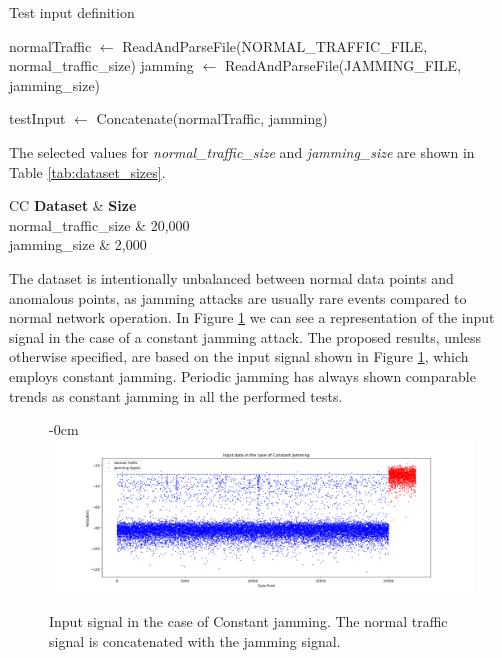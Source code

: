 \documentclass[futureinternet,article,submit,pdftex,moreauthors]{Definitions/mdpi}
\begin{document}
\begin{algorithm}
	\caption{Test input definition}\label{alg:dataset_concatenation}
	\begin{algorithmic}[1]
	\State normalTraffic $\gets$ ReadAndParseFile(NORMAL\_TRAFFIC\_FILE, normal\_traffic\_size)
	\State jamming $\gets$ ReadAndParseFile(JAMMING\_FILE, jamming\_size)

	\State testInput $\gets$ Concatenate(normalTraffic, jamming)
	\end{algorithmic}
\end{algorithm}

The selected values for \textit{normal\_traffic\_size} and \textit{jamming\_size} are shown in Table \ref{tab:dataset_sizes}. 

\begin{table}[H]
	\caption{Dataset sizes used for the tuning and testing phases.}\label{tab:dataset_sizes}
	\begin{tabularx}{\textwidth}{CC}
	\toprule
	\textbf{Dataset} & \textbf{Size} \\
	\midrule
	normal\_traffic\_size & 20,000 \\
	jamming\_size & 2,000 \\
	\bottomrule
\end{tabularx}
\end{table}

The dataset is intentionally unbalanced between normal data points and anomalous points, as jamming attacks are usually rare events compared to normal network operation. 
In Figure \ref{fig:InputSignal} we can see a representation of the input signal in the case of a constant jamming attack. The proposed results, unless otherwise specified, are based on the input signal shown in Figure \ref{fig:InputSignal}, which employs constant jamming. Periodic jamming has always shown comparable trends as constant jamming in all the performed tests.


\begin{figure}[H]
    \begin{adjustwidth}{-\extralength}{0cm}
        \centering
        \includegraphics[width=21cm]{img/InputSignal.png}
    \end{adjustwidth}
    \caption{Input signal in the case of Constant jamming. The normal traffic signal is concatenated with the jamming signal.}
    \label{fig:InputSignal}
\end{figure}
\end{document}
